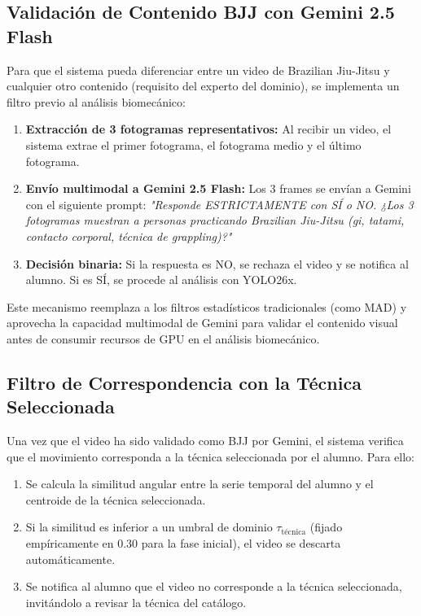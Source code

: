 \documentclass[12pt,letterpaper]{article}
\begin{document}
\subsection{Validación de Contenido BJJ con Gemini 2.5 Flash}

Para que el sistema pueda diferenciar entre un video de Brazilian Jiu-Jitsu y cualquier otro contenido (requisito del experto del dominio), se implementa un filtro previo al análisis biomecánico:

\begin{enumerate}
    \item \textbf{Extracción de 3 fotogramas representativos:} Al recibir un video, el sistema extrae el primer fotograma, el fotograma medio y el último fotograma.
    \item \textbf{Envío multimodal a Gemini 2.5 Flash:} Los 3 frames se envían a Gemini con el siguiente prompt: \textit{"Responde ESTRICTAMENTE con SÍ o NO. ¿Los 3 fotogramas muestran a personas practicando Brazilian Jiu-Jitsu (gi, tatami, contacto corporal, técnica de grappling)?"}
    \item \textbf{Decisión binaria:} Si la respuesta es NO, se rechaza el video y se notifica al alumno. Si es SÍ, se procede al análisis con YOLO26x.
\end{enumerate}

Este mecanismo reemplaza a los filtros estadísticos tradicionales (como MAD) y aprovecha la capacidad multimodal de Gemini para validar el contenido visual antes de consumir recursos de GPU en el análisis biomecánico.

\subsection{Filtro de Correspondencia con la Técnica Seleccionada}

Una vez que el video ha sido validado como BJJ por Gemini, el sistema verifica que el movimiento corresponda a la técnica seleccionada por el alumno. Para ello:

\begin{enumerate}
    \item Se calcula la similitud angular entre la serie temporal del alumno y el centroide de la técnica seleccionada.
    \item Si la similitud es inferior a un umbral de dominio $\tau_{\text{técnica}}$ (fijado empíricamente en 0.30 para la fase inicial), el video se descarta automáticamente.
    \item Se notifica al alumno que el video no corresponde a la técnica seleccionada, invitándolo a revisar la técnica del catálogo.
\end{enumerate}
\end{document}
